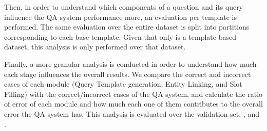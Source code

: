 Then, in order to understand which components of a question and its \SPARQL{} query influence the 
QA system performance more, an evaluation per template is performed. The same evaluation over 
the entire dataset is split into partitions corresponding to each \LCQuADtwo{} base template. Given 
that only \LCQuADtwo{} is a template-based dataset, this analysis is only performed over that 
dataset.

Finally, a more granular analysis is conducted in order to understand how much each stage 
influences the overall results. We compare the correct and incorrect cases of each module (Query 
Template generation, Entity Linking, and Slot Filling) with the correct/incorrect cases of the 
QA system, and calculate the ratio of error of each module and how much each one of them 
contributes to the overall error the QA system has. This analysis is evaluated over the \LCQuADtwo{} 
validation set, \QALDseven{}, and \WikiSPARQL{}.
